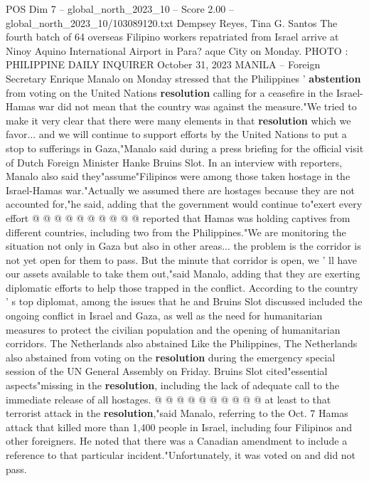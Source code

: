 \begin{textsample}{POS Dim 7 – global\_north\_2023\_10 – Score 2.00 – global\_north\_2023\_10/103089120.txt}  \label{ex:f7_pos_427}
Dempsey Reyes, Tina G.
Santos The fourth batch of 64 overseas Filipino workers repatriated from Israel arrive at Ninoy Aquino International Airport in Para? aque City on Monday.
PHOTO : PHILIPPINE DAILY INQUIRER October 31, 2023 MANILA -- Foreign Secretary Enrique Manalo on Monday stressed that the Philippines ' \textbf{abstention} from voting on the United Nations \textbf{resolution} calling for a ceasefire in the Israel-Hamas war did not mean that the country was against the measure."We tried to make it very clear that there were many elements in that \textbf{resolution} which we favor... and we will continue to support efforts by the United Nations to put a stop to sufferings in Gaza,"Manalo said during a press briefing for the official visit of Dutch Foreign Minister Hanke Bruins Slot.
In an interview with reporters, Manalo also said they"assume"Filipinos were among those taken hostage in the Israel-Hamas war."Actually we assumed there are hostages because they are not accounted for,"he said, adding that the government would continue to"exert every effort @ @ @ @ @ @ @ @ @ @ reported that Hamas was holding captives from different countries, including two from the Philippines."We are monitoring the situation not only in Gaza but also in other areas... the problem is the corridor is not yet open for them to pass.
But the minute that corridor is open, we ' ll have our assets available to take them out,"said Manalo, adding that they are exerting diplomatic efforts to help those trapped in the conflict.
According to the country ' s top diplomat, among the issues that he and Bruins Slot discussed included the ongoing conflict in Israel and Gaza, as well as the need for humanitarian measures to protect the civilian population and the opening of humanitarian corridors.
The Netherlands also abstained Like the Philippines, The Netherlands also abstained from voting on the \textbf{resolution} during the emergency special session of the UN General Assembly on Friday.
Bruins Slot cited"essential aspects"missing in the \textbf{resolution}, including the lack of adequate call to the immediate release of all hostages. @ @ @ @ @ @ @ @ @ @ at least to that terrorist attack in the \textbf{resolution},"said Manalo, referring to the Oct. 7 Hamas attack that killed more than 1,400 people in Israel, including four Filipinos and other foreigners.
He noted that there was a Canadian amendment to include a reference to that particular incident."Unfortunately, it was voted on and did not pass.

\end{textsample}
